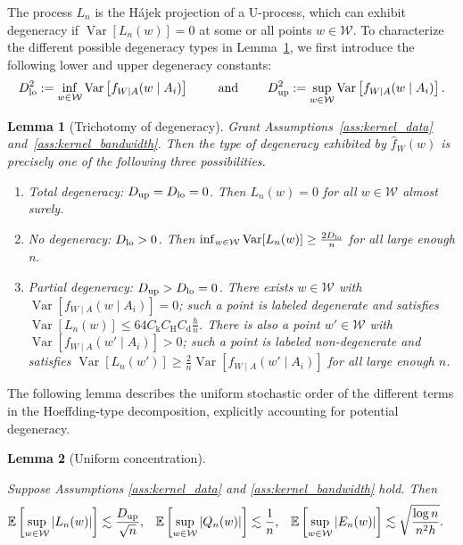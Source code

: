 \documentclass[11pt,lof]{puthesis}
\newcommand{\E}{\ensuremath{\mathbb{E}}}
\newcommand{\rH}{\ensuremath{\mathrm{H}}}
\newcommand{\rk}{\ensuremath{\mathrm{k}}}
\newcommand{\rd}{\ensuremath{\mathrm{d}}}
\newcommand{\cW}{\ensuremath{\mathcal{W}}}
\newcommand{\Dl}{\ensuremath{D_{\textup{lo}}}}
\newcommand{\Du}{\ensuremath{D_{\textup{up}}}}
\DeclareMathOperator{\Var}{Var}
\theoremstyle{break}
\newtheorem{lemma}{Lemma}[section]
\theoremstyle{proof}
\begin{document}
The process $L_n$ is the H{\'a}jek projection of a U-process,
which can exhibit degeneracy if $\Var[L_n(w)] = 0$ at some
or all points $w \in \cW$. To characterize the different possible
degeneracy types in Lemma~\ref{lem:kernel_trichotomy},
we first introduce the following lower and upper degeneracy constants:
%
\begin{align*}
  \Dl^2 := \inf_{w \in \cW} \Var\left[f_{W \mid A}(w \mid A_i)\right]
  \qquad \text{ and } \qquad
  \Du^2 := \sup_{w \in \cW} \Var\left[f_{W \mid A}(w \mid A_i)\right].
\end{align*}
%
\begin{lemma}[Trichotomy of degeneracy]%
  \label{lem:kernel_trichotomy}%
  Grant Assumptions~\ref{ass:kernel_data} and~\ref{ass:kernel_bandwidth}.
  Then the type of degeneracy exhibited by $\hat f_W(w)$
  is precisely one of the following three possibilities.
  \begin{enumerate}[label=(\roman*)]

    \item Total degeneracy:
      $\Du = \Dl = 0$. Then $L_n(w) = 0$ for all $w \in \cW$ almost surely.

    \item No degeneracy:
      $\Dl > 0$. Then $\inf_{w \in \cW} \Var[L_n(w)] \geq \frac{2 \Dl}{n}$
      for all large enough n.

    \item Partial degeneracy:
      $\Du > \Dl = 0$. There exists $w \in \cW$ with
      $\Var\left[f_{W \mid A}(w \mid A_i)\right] = 0$;
      such a point is labeled \emph{degenerate} and satisfies
      $\Var[L_n(w)] \leq 64 C_\rk C_\rH C_\rd \frac{h}{n}$.
      There is also a point $w' \in \cW$ with
      $\Var\left[f_{W \mid A}(w' \mid A_i)\right] > 0$;
      such a point is labeled \emph{non-degenerate} and satisfies
      $\Var[L_n(w')] \geq
      \frac{2}{n} \Var\left[f_{W \mid A}(w' \mid A_i)\right]$
      for all large enough $n$.

  \end{enumerate}

\end{lemma}

The following lemma describes the uniform stochastic order of the different
terms in the Hoeffding-type decomposition, explicitly accounting for potential
degeneracy.

\begin{lemma}[Uniform concentration]
  \label{lem:kernel_uniform_concentration}

  Suppose Assumptions \ref{ass:kernel_data} and
  \ref{ass:kernel_bandwidth} hold. Then
  \begin{align*}
    \E\left[ \sup_{w \in \cW} |L_n(w)| \right]
    &\lesssim \frac{\Du}{\sqrt n},
    &\E\left[ \sup_{w \in \cW} |Q_n(w)| \right]
    &\lesssim \frac{1}{n},
    &\E\left[ \sup_{w \in \cW} |E_n(w)| \right]
    &\lesssim \sqrt{\frac{\log n}{n^2h}}.
  \end{align*}
\end{lemma}
\end{document}
